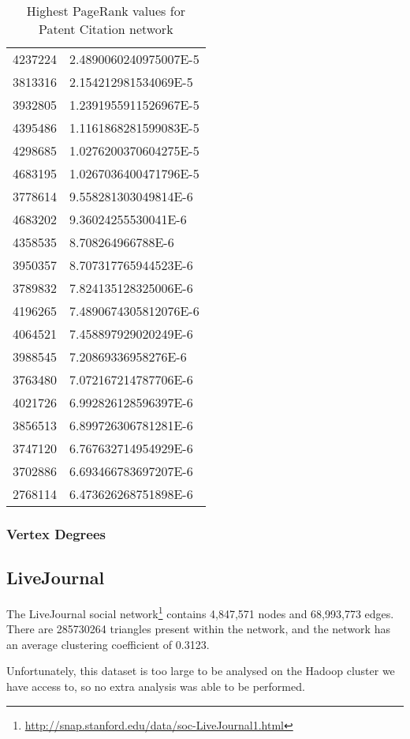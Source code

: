 \begin{table}%
\begin{tabular}{|l|l|}
\hline
\hline
4237224 & 2.4890060240975007E-5 \\
3813316 & 2.154212981534069E-5 \\
3932805 & 1.2391955911526967E-5 \\
4395486 & 1.1161868281599083E-5 \\
4298685 & 1.0276200370604275E-5 \\
4683195 & 1.0267036400471796E-5 \\
3778614 & 9.558281303049814E-6 \\
4683202 & 9.36024255530041E-6 \\
4358535 & 8.708264966788E-6 \\
3950357 & 8.707317765944523E-6 \\
3789832 & 7.824135128325006E-6 \\
4196265 & 7.4890674305812076E-6 \\
4064521 & 7.458897929020249E-6 \\
3988545 & 7.20869336958276E-6 \\
3763480 & 7.072167214787706E-6 \\
4021726 & 6.992826128596397E-6 \\
3856513 & 6.899726306781281E-6 \\
3747120 & 6.767632714954929E-6 \\
3702886 & 6.693466783697207E-6 \\
2768114 & 6.473626268751898E-6 \\
\hline
\end{tabular}
\caption{Highest PageRank values for Patent Citation network}
\label{tab:patentspr}
\end{table}

\subsubsection{Vertex Degrees}

\subsection{LiveJournal}
The LiveJournal social network\footnote{\url{http://snap.stanford.edu/data/soc-LiveJournal1.html}} contains 4,847,571 nodes and 68,993,773 edges. There are 285730264 triangles present within the network, and the network has an average clustering coefficient of 0.3123.

Unfortunately, this dataset is too large to be analysed on the Hadoop cluster we have access to, so no extra analysis was able to be performed.

